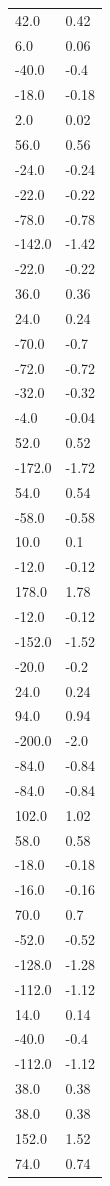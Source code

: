 \begin{longtable}{ll}
42.0 & 0.42 \\
6.0 & 0.06 \\
-40.0 & -0.4 \\
-18.0 & -0.18 \\
2.0 & 0.02 \\
56.0 & 0.56 \\
-24.0 & -0.24 \\
-22.0 & -0.22 \\
-78.0 & -0.78 \\
-142.0 & -1.42 \\
-22.0 & -0.22 \\
36.0 & 0.36 \\
24.0 & 0.24 \\
-70.0 & -0.7 \\
-72.0 & -0.72 \\
-32.0 & -0.32 \\
-4.0 & -0.04 \\
52.0 & 0.52 \\
-172.0 & -1.72 \\
54.0 & 0.54 \\
-58.0 & -0.58 \\
10.0 & 0.1 \\
-12.0 & -0.12 \\
178.0 & 1.78 \\
-12.0 & -0.12 \\
-152.0 & -1.52 \\
-20.0 & -0.2 \\
24.0 & 0.24 \\
94.0 & 0.94 \\
-200.0 & -2.0 \\
-84.0 & -0.84 \\
-84.0 & -0.84 \\
102.0 & 1.02 \\
58.0 & 0.58 \\
-18.0 & -0.18 \\
-16.0 & -0.16 \\
70.0 & 0.7 \\
-52.0 & -0.52 \\
-128.0 & -1.28 \\
-112.0 & -1.12 \\
14.0 & 0.14 \\
-40.0 & -0.4 \\
-112.0 & -1.12 \\
38.0 & 0.38 \\
38.0 & 0.38 \\
152.0 & 1.52 \\
74.0 & 0.74 \\

\end{longtable}
